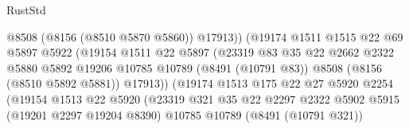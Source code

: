 \begin{lexlean}{RustStd}
\begin{coremodule}
                                          @8508
                                          (@8156 (@8510 @5870 @5860))
                                          @17913))
                                      (@19174
                                        @1511
                                        @1515
                                        @22
                                        @69
                                        @5897
                                        @5922
                                        (@19154
                                          @1511
                                          @22
                                          @5897
                                          (@23319
                                            @83
                                            @35
                                            @22
                                            @2662
                                            @2322
                                            @5880
                                            @5892
                                            @19206
                                            @10785
                                            @10789
                                            (@8491 (@10791 @83))
                                            @8508
                                            (@8156 (@8510 @5892 @5881))
                                            @17913))
                                        (@19174
                                          @1513
                                          @175
                                          @22
                                          @27
                                          @5920
                                          @2254
                                          (@19154
                                            @1513
                                            @22
                                            @5920
                                            (@23319
                                              @321
                                              @35
                                              @22
                                              @2297
                                              @2322
                                              @5902
                                              @5915
                                              (@19201 @2297 @19204 @8390)
                                              @10785
                                              @10789
                                              (@8491 (@10791 @321))

\end{coremodule}
\end{lexlean}
